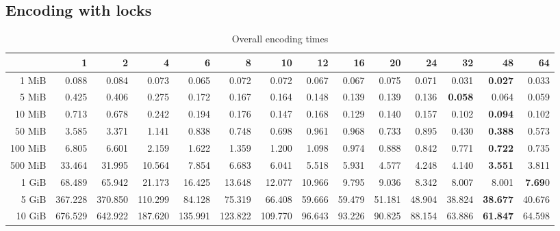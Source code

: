 \subsection{Encoding with locks}
\begin{centering}
\begin{table}[!h]
	\caption{Overall encoding times}
	\begin{tabular}{rrrrrrrrrrrrrr}
		\toprule
		\diagbox[width=7em]{Size}{Threads} & 1  &      2  &      4  &      6  &      8  &      10 &     12 &     16 &     20 &     24 &     32 &     48 &     64 \\
		\midrule
		1 MiB   &   0.088 &   0.084 &   0.073 &   0.065 &   0.072 &   0.072 &  0.067 &  0.067 &  0.075 &  0.071 &  0.031 &  \textbf{0.027} &  0.033 \\
		5 MiB   &   0.425 &   0.406 &   0.275 &   0.172 &   0.167 &   0.164 &  0.148 &  0.139 &  0.139 &  0.136 &  \textbf{0.058} &  0.064 &  0.059 \\
		10 MiB  &   0.713 &   0.678 &   0.242 &   0.194 &   0.176 &   0.147 &  0.168 &  0.129 &  0.140 &  0.157 &  0.102 &  \textbf{0.094} &  0.102 \\
		50 MiB  &   3.585 &   3.371 &   1.141 &   0.838 &   0.748 &   0.698 &  0.961 &  0.968 &  0.733 &  0.895 &  0.430 &  \textbf{0.388} &  0.573 \\
		100 MiB &   6.805 &   6.601 &   2.159 &   1.622 &   1.359 &   1.200 &  1.098 &  0.974 &  0.888 &  0.842 &  0.771 &  \textbf{0.722} &  0.735 \\
		500 MiB &  33.464 &  31.995 &  10.564 &   7.854 &   6.683 &   6.041 &  5.518 &  5.931 &  4.577 &  4.248 &  4.140 &  \textbf{3.551} &  3.811 \\
		1 GiB   &  68.489 &  65.942 &  21.173 &  16.425 &  13.648 &  12.077 & 10.966 &  9.795 &  9.036 &  8.342 &  8.007 &  8.001 &  \textbf{7.69}0 \\
		5 GiB   & 367.228 & 370.850 & 110.299 &  84.128 &  75.319 &  66.408 & 59.666 & 59.479 & 51.181 & 48.904 & 38.824 & \textbf{38.677} & 40.676 \\
		10 GiB  & 676.529 & 642.922 & 187.620 & 135.991 & 123.822 & 109.770 & 96.643 & 93.226 & 90.825 & 88.154 & 63.886 & \textbf{61.847} & 64.598 \\
		\bottomrule
	\end{tabular}
	

\end{table}
\end{centering}
